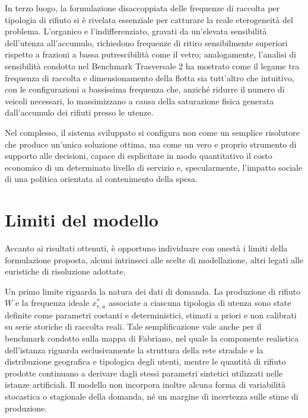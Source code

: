 In terzo luogo, la formulazione disaccoppiata delle frequenze di raccolta per tipologia di rifiuto si è rivelata essenziale per catturare la reale eterogeneità del problema. L'organico e l'indifferenziato, gravati da un'elevata sensibilità dell'utenza all'accumulo, richiedono frequenze di ritiro sensibilmente superiori rispetto a frazioni a bassa putrescibilità come il vetro; analogamente, l'analisi di sensibilità condotta nel Benchmark Trasversale 2 ha mostrato come il legame tra frequenza di raccolta e dimensionamento della flotta sia tutt'altro che intuitivo, con le configurazioni a bassissima frequenza che, anziché ridurre il numero di veicoli necessari, lo massimizzano a causa della saturazione fisica generata dall'accumulo dei rifiuti presso le utenze.

Nel complesso, il sistema sviluppato si configura non come un semplice risolutore che produce un'unica soluzione ottima, ma come un vero e proprio strumento di supporto alle decisioni, capace di esplicitare in modo quantitativo il costo economico di un determinato livello di servizio e, specularmente, l'impatto sociale di una politica orientata al contenimento della spesa.

\section*{Limiti del modello}

Accanto ai risultati ottenuti, è opportuno individuare con onestà i limiti della formulazione proposta, alcuni intrinseci alle scelte di modellazione, altri legati alle euristiche di risoluzione adottate.

Un primo limite riguarda la natura dei dati di domanda. La produzione di rifiuto $W$ e la frequenza ideale $x^*_{r,u}$ associate a ciascuna tipologia di utenza sono state definite come parametri costanti e deterministici, stimati a priori e non calibrati su serie storiche di raccolta reali. Tale semplificazione vale anche per il benchmark condotto sulla mappa di Fabriano, nel quale la componente realistica dell'istanza riguarda esclusivamente la struttura della rete stradale e la distribuzione geografica e tipologica degli utenti, mentre le quantità di rifiuto prodotte continuano a derivare dagli stessi parametri sintetici utilizzati nelle istanze artificiali. Il modello non incorpora inoltre alcuna forma di variabilità stocastica o stagionale della domanda, né un margine di incertezza sulle stime di produzione.

